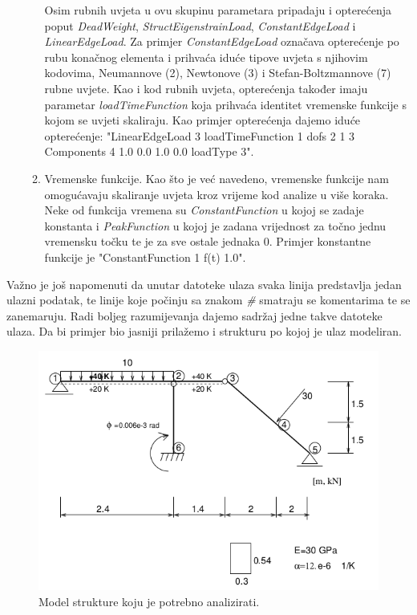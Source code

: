 \documentclass[a4paper,twoside,12pt]{memoir} %
\begin{document}
\begin{enumerate}
\begin{enumerate}
        Osim rubnih uvjeta u ovu skupinu parametara pripadaju i opterećenja poput \textit{DeadWeight}, \textit{StructEigenstrainLoad}, \textit{ConstantEdgeLoad} i \textit{LinearEdgeLoad}. Za primjer \textit{ConstantEdgeLoad} označava opterećenje po rubu konačnog elementa i prihvaća iduće tipove uvjeta s njihovim kodovima, Neumannove (2), Newtonove (3) i Stefan-Boltzmannove (7) rubne uvjete. Kao i kod rubnih uvjeta, opterećenja također imaju parametar \textit{loadTimeFunction} koja prihvaća identitet vremenske funkcije s kojom se uvjeti skaliraju. Kao primjer opterećenja dajemo iduće opterećenje: "LinearEdgeLoad 3 loadTimeFunction 1 dofs 2 1 3 Components 4 1.0 0.0 1.0 0.0 loadType 3".
        \item Vremenske funkcije. Kao što je već navedeno, vremenske funkcije nam omogućavaju skaliranje uvjeta kroz vrijeme kod analize u više koraka. Neke od funkcija vremena su \textit{ConstantFunction} u kojoj se zadaje konstanta i \textit{PeakFunction} u kojoj je zadana vrijednost za točno jednu vremensku točku te je za sve ostale jednaka 0. Primjer konstantne funkcije je "ConstantFunction 1 f(t) 1.0".
    \end{enumerate}
\end{enumerate}

Važno je još napomenuti da unutar datoteke ulaza svaka linija predstavlja jedan ulazni podatak, te linije koje počinju sa znakom \textit{\#} smatraju se komentarima te se zanemaruju. Radi boljeg razumijevanja dajemo sadržaj jedne takve datoteke ulaza. Da bi primjer bio jasniji prilažemo i strukturu po kojoj je ulaz modeliran.

\begin{figure}[h!t]
\begin{center}
\includegraphics[scale=0.51]{pictures/chapter_oofem/structure_to_analyze.png}
\caption{Model strukture koju je potrebno analizirati. \cite{oofem-web}}
\label{fig:Structure_to_analyze}
\end{center}
\end{figure}
\end{document}
